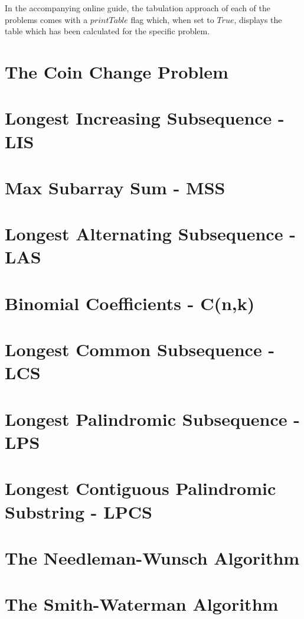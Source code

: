 In the accompanying online guide, the tabulation approach of each of the problems comes with a $printTable$ flag which, when set to $True$, displays the table which has been calculated for the specific problem.

\section{The Coin Change Problem}


\section{Longest Increasing Subsequence - LIS}


\section{Max Subarray Sum - MSS}


\section{Longest Alternating Subsequence - LAS}


\section{Binomial Coefficients - C(n,k)}


\section{Longest Common Subsequence - LCS} \label{section:lcs}


\section{Longest Palindromic Subsequence - LPS}


\section{Longest Contiguous Palindromic Substring - LPCS}


\section{The Needleman-Wunsch Algorithm}


\section{The Smith-Waterman Algorithm}



